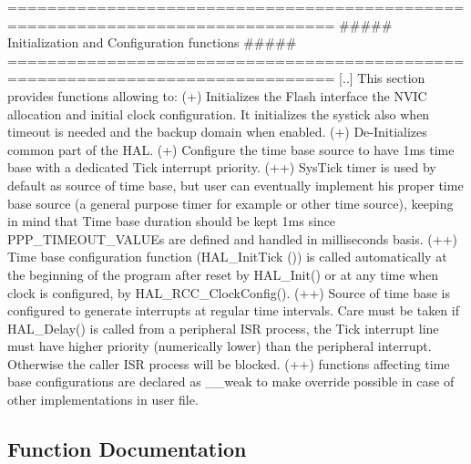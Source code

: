 \begin{DoxyVerb} ===============================================================================
              ##### Initialization and Configuration functions #####
 ===============================================================================
    [..]  This section provides functions allowing to:
      (+) Initializes the Flash interface the NVIC allocation and initial clock 
          configuration. It initializes the systick also when timeout is needed 
          and the backup domain when enabled.
      (+) De-Initializes common part of the HAL.
      (+) Configure the time base source to have 1ms time base with a dedicated 
          Tick interrupt priority. 
        (++) SysTick timer is used by default as source of time base, but user
             can eventually implement his proper time base source (a general purpose 
             timer for example or other time source), keeping in mind that Time base 
             duration should be kept 1ms since PPP_TIMEOUT_VALUEs are defined and 
             handled in milliseconds basis.
        (++) Time base configuration function (HAL_InitTick ()) is called automatically 
             at the beginning of the program after reset by HAL_Init() or at any time 
             when clock is configured, by HAL_RCC_ClockConfig(). 
        (++) Source of time base is configured  to generate interrupts at regular 
             time intervals. Care must be taken if HAL_Delay() is called from a 
             peripheral ISR process, the Tick interrupt line must have higher priority 
            (numerically lower) than the peripheral interrupt. Otherwise the caller 
            ISR process will be blocked. 
       (++) functions affecting time base configurations are declared as __weak  
             to make  override possible  in case of other  implementations in user file.
\end{DoxyVerb}
 

\subsection{Function Documentation}
\mbox{\label{group___h_a_l___exported___functions___group1_ga95911129a26afb05232caaaefa31956f}} 
